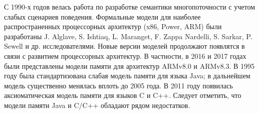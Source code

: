 


{\progress}
С 1990-х годов велась работа по
разработке семантики многопоточности с учетом слабых сценариев поведения.
Формальные модели для наиболее распространенных процессорных архитектур (x86, Power, ARM)
были разработаны J. Alglave, S. Ishtiaq, L. Maranget, F. Zappa Nardelli, S. Sarkar, P. Sewell и др. исследователями.
Новые версии моделей продолжают появлятся в связи с развитием процессорных архитектур.
В частности, в 2016 и 2017 годах были представлены модели памяти для архитектур ARMv8.0 и ARMv8.3.
В 1995 году была стандартизована слабая модель памяти для языка Java; в дальнейшем модель существенно менялась вплоть до 2005 года.
В 2011 году появилась аксиоматическая модель памяти для языков C и C++.
Следует отметить, что модели памяти Java и C/C++ обладают рядом недостатков.

